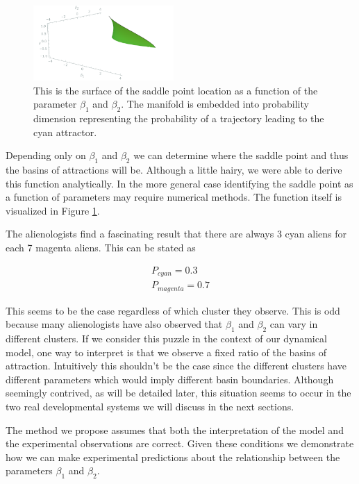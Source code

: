 \documentclass[letterpaper]{article}
\begin{document}
\begin{figure}[t]
\begin{center}
\includegraphics[width=2.1in,angle=0]{./saddle_cubic.png}
\caption{This is the surface of the saddle point location as a function of
the parameter $\beta_1$ and $\beta_2$. The manifold is embedded into probability
dimension representing the probability of a trajectory leading to the cyan attractor.}
\label{cubic_saddle}
\end{center}
\end{figure}

Depending only on $\beta_1$ and $\beta_2$ we
can determine where the saddle point and thus the basins of attractions will be.
Although a little hairy, we were able to derive this function analytically. In 
the more general case identifying the saddle point as a function of parameters 
may require numerical methods. The function itself is visualized in
Figure \ref{cubic_saddle}. 

The alienologists find a fascinating result that there
are always 3 cyan aliens for each 7 magenta aliens. This can be stated as 

\begin{eqnarray}
  P_{cyan} = 0.3\\
  P_{magenta} = 0.7
\end{eqnarray}

This seems to be the case regardless
of which cluster they observe. This is odd because many alienologists have
also observed that $\beta_1$ and $\beta_2$ can vary in different clusters. 
If we consider this puzzle in the context of our dynamical
model, one way to interpret is that we observe a fixed ratio of the basins of
attraction. Intuitively this shouldn't be the case since the different
clusters have different parameters which would imply different basin boundaries.
Although seemingly contrived, as will be detailed later, 
this situation seems to occur in the two
real developmental systems we will discuss in the next sections.

The method we propose assumes that both the interpretation of the model and the
experimental observations are correct. Given these conditions we demonstrate 
how we can make experimental predictions about the relationship between the 
parameters $\beta_1$ and $\beta_2$.
\end{document}
